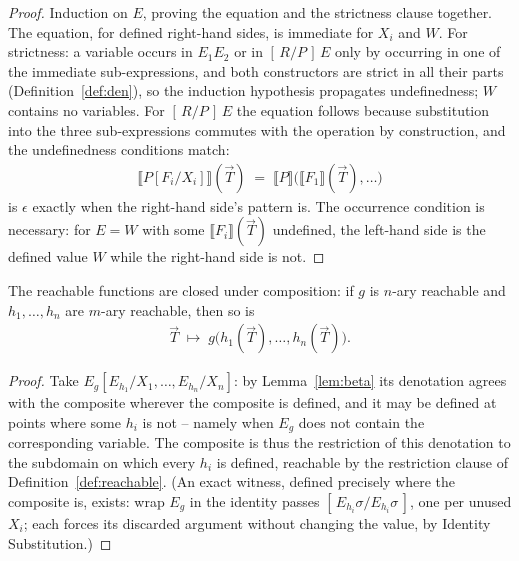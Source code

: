\documentclass[runningheads,envcountsect]{llncs}
\begin{document}
\begin{proof}
    Induction on $E$, proving the equation and the strictness clause together. The equation, for defined right-hand sides, is immediate for $X_i$ and $W$. For strictness: a variable occurs in $E_1E_2$ or in $[\,R/P\,]\,E$ only by occurring in one of the immediate sub-expressions, and both constructors are strict in all their parts (Definition~\ref{def:den}), so the induction hypothesis propagates undefinedness; $W$ contains no variables. For $[\,R/P\,]\,E$ the equation follows because substitution into the three sub-expressions commutes with the operation by construction, and the undefinedness conditions match:
    \begin{align*}
        \llbracket P[F_i/X_i] \rrbracket(\vec T) \;=\; \llbracket P \rrbracket\big(\llbracket F_1 \rrbracket(\vec T), \dots\big)
    \end{align*}
    is $\epsilon$ exactly when the right-hand side's pattern is. The occurrence condition is necessary: for $E = W$ with some $\llbracket F_i \rrbracket(\vec T)$ undefined, the left-hand side is the defined value $W$ while the right-hand side is not.
\end{proof}

\begin{corollary}
    \label{cor:closure}
    The reachable functions are closed under composition: if $g$ is $n$-ary reachable and $h_1, \dots, h_n$ are $m$-ary reachable, then so is
    \begin{align*}
        \vec T \;\mapsto\; g\big(h_1(\vec T), \dots, h_n(\vec T)\big).
    \end{align*}
\end{corollary}

\begin{proof}
    Take $E_g[E_{h_1}/X_1, \dots, E_{h_n}/X_n]$: by Lemma~\ref{lem:beta} its denotation agrees with the composite wherever the composite is defined, and it may be defined at points where some $h_i$ is not -- namely when $E_g$ does not contain the corresponding variable. The composite is thus the restriction of this denotation to the subdomain on which every $h_i$ is defined, reachable by the restriction clause of Definition~\ref{def:reachable}. (An exact witness, defined precisely where the composite is, exists: wrap $E_g$ in the identity passes $[\,E_{h_i}\sigma/E_{h_i}\sigma\,]$, one per unused $X_i$; each forces its discarded argument without changing the value, by Identity Substitution.)
\end{proof}
\end{document}
